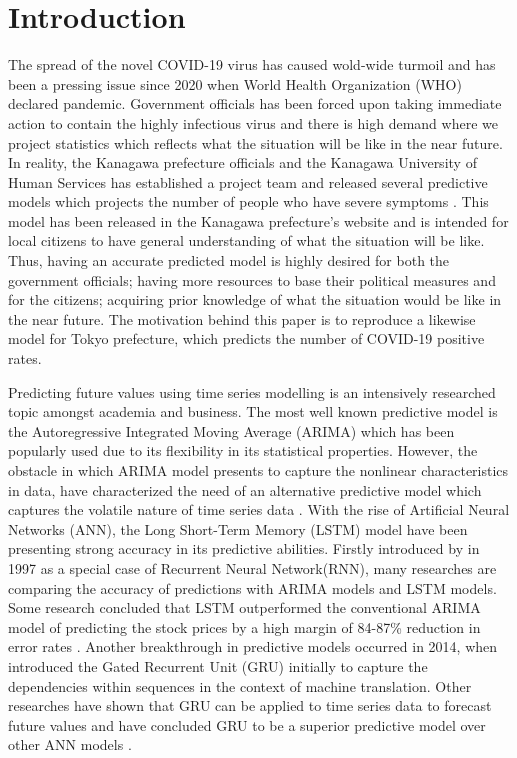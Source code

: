 \section{Introduction}

The spread of the novel COVID-19 virus has caused wold-wide turmoil and has been a pressing issue since 2020 when World Health Organization (WHO) declared pandemic. Government officials has been forced upon taking immediate action to contain the highly infectious virus and there is high demand where we project statistics which reflects what the situation will be like in the near future. In reality, the Kanagawa prefecture officials and the Kanagawa University of Human Services has established a project team and released several predictive models which projects the number of people who have severe symptoms \citep{Kanagawa_prediction}. This model has been released in the Kanagawa prefecture's website and is intended for local citizens to have general understanding of what the situation will be like. Thus, having an accurate predicted model is highly desired for both the government officials; having more resources to base their political measures and for the citizens; acquiring prior knowledge of what the situation would be like in the near future. The motivation behind this paper is to reproduce a likewise model for Tokyo prefecture, which predicts the number of COVID-19 positive rates. 

Predicting future values using time series modelling is an intensively researched topic amongst academia and business. The most well known predictive model is the Autoregressive Integrated Moving Average (ARIMA) which has been popularly used due to its flexibility in its statistical properties. However, the obstacle in which ARIMA model presents to capture the nonlinear characteristics in data, have characterized the need of an alternative predictive model which captures the volatile nature of time series data \citep{Time_Series_forecasting_ARIMA}. With the rise of Artificial Neural Networks (ANN), the Long Short-Term Memory (LSTM) model have been presenting strong accuracy in its predictive abilities. Firstly introduced by \cite{LSTM} in 1997 as a special case of Recurrent Neural Network(RNN), many researches are comparing the accuracy of predictions with ARIMA models and LSTM models. Some research concluded that LSTM outperformed the conventional ARIMA model of predicting the stock prices by a high margin of 84-87\% reduction in error rates \citep{Comparison_ARIMA_LSTM}. Another breakthrough in predictive models occurred in 2014, when \citet{GRU} introduced the Gated Recurrent Unit (GRU) initially to capture the dependencies within sequences in the context of machine translation. Other researches have shown that GRU can be applied to time series data to forecast future values and have concluded GRU to be a superior predictive model over other ANN models \citep{GRU_performance}. 

